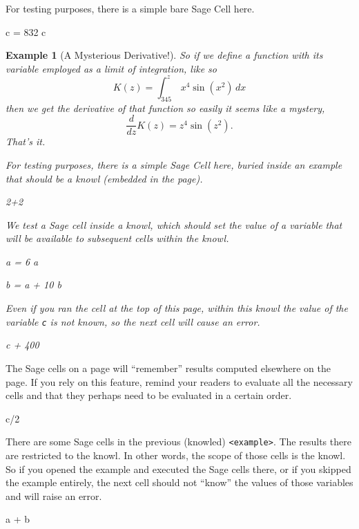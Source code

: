 \documentclass[pdflatex]{sn-jnl}
\theoremstyle{thmstyleone}%
\theoremstyle{thmstyletwo}%
\newtheorem{example}[theorem]{Example}
\theoremstyle{thmstylethree}%
\newcommand{\mono}[1]{\texttt{#1}}
\numberwithin{equation}{section}
\newcommand{\definiteintegral}[4]{\int_{#1}^{#2}\,#3\,d#4}
\begin{document}
For testing purposes, there is a simple bare Sage Cell here.%
\begin{sageinput}
c = 832
c
\end{sageinput}
\begin{example}[A Mysterious Derivative!]\label{example-mysterious}%
%
So if we define a function with its variable employed as a limit of integration, like so%
\begin{equation*}
K(z)=\definiteintegral{345}{z}{x^4\sin(x^2)}{x}
\end{equation*}
then we get the derivative of that function so easily it seems like a mystery,%
\begin{equation*}
\frac{d}{dz}K(z)=z^4\sin(z^2)\text{.}
\end{equation*}
That's it.%
\par
For testing purposes, there is a simple Sage Cell here, buried inside an example that should be a knowl (embedded in the page).%
\begin{sageinput}
2+2
\end{sageinput}
We test a Sage cell inside a knowl, which should set the value of a variable that will be available to subsequent cells within the knowl.%
\begin{sageinput}
a = 6
a
\end{sageinput}
\begin{sageinput}
b = a + 10
b
\end{sageinput}
Even if you ran the cell at the top of this page, within this knowl the value of the variable \mono{c} is not known, so the next cell will cause an error.%
\begin{sageinput}
c + 400
\end{sageinput}
\end{example}
The Sage cells on a page will ``remember'' results computed elsewhere on the page.  If you rely on this feature, remind your readers to evaluate all the necessary cells and that they perhaps need to be evaluated in a certain order.%
\begin{sageinput}
c/2
\end{sageinput}
There are some Sage cells in the previous (knowled) \mono{<example>}.  The results there are restricted to the knowl.  In other words, the scope of those cells is the knowl.  So if you opened the example and executed the Sage cells there, or if you skipped the example entirely, the next cell should not ``know'' the values of those variables and will raise an error.%
\begin{sageinput}
a + b
\end{sageinput}
\end{document}

